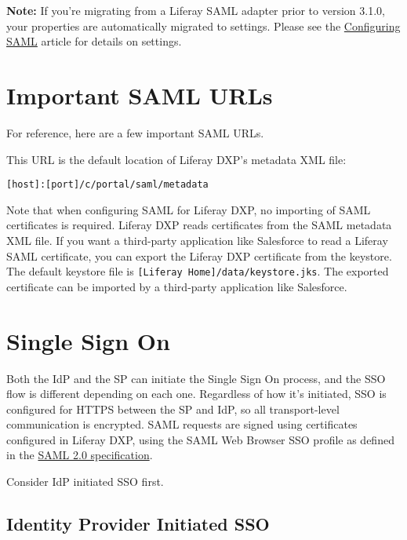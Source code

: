 \textbf{Note:} If you're migrating from a Liferay SAML adapter prior to
version 3.1.0, your properties are automatically migrated to settings.
Please see the
\href{/docs/7-0/deploy/-/knowledge_base/d/configuring-saml}{Configuring
SAML} article for details on settings.

\noindent\hrulefill

\section{Important SAML URLs}\label{important-saml-urls}

For reference, here are a few important SAML URLs.

This URL is the default location of Liferay DXP's metadata XML file:

\begin{verbatim}
[host]:[port]/c/portal/saml/metadata
\end{verbatim}

Note that when configuring SAML for Liferay DXP, no importing of SAML
certificates is required. Liferay DXP reads certificates from the SAML
metadata XML file. If you want a third-party application like Salesforce
to read a Liferay SAML certificate, you can export the Liferay DXP
certificate from the keystore. The default keystore file is
\texttt{{[}Liferay\ Home{]}/data/keystore.jks}. The exported certificate
can be imported by a third-party application like Salesforce.

\section{Single Sign On}\label{single-sign-on}

Both the IdP and the SP can initiate the Single Sign On process, and the
SSO flow is different depending on each one. Regardless of how it's
initiated, SSO is configured for HTTPS between the SP and IdP, so all
transport-level communication is encrypted. SAML requests are signed
using certificates configured in Liferay DXP, using the SAML Web Browser
SSO profile as defined in the
\href{http://saml.xml.org/saml-specifications}{SAML 2.0 specification}.

Consider IdP initiated SSO first.

\subsection{Identity Provider Initiated
SSO}\label{identity-provider-initiated-sso}

